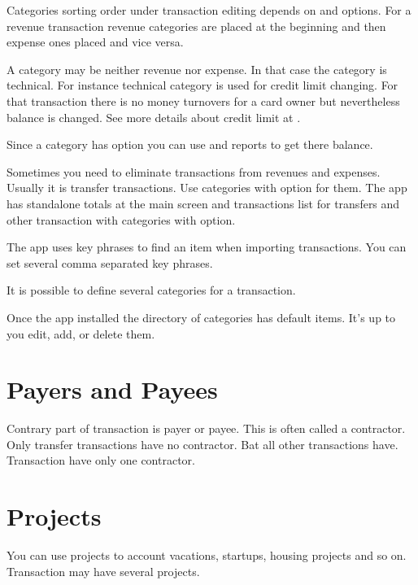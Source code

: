 \documentclass[a4paper,10pt,english]{sphinxmanual}
\begin{document}
Categories sorting order under transaction editing depends on
 and  options. For a revenue transaction
revenue categories are placed at the beginning and then expense ones placed and vice versa.

A category may be neither revenue nor expense. In that case the category is technical. For instance
technical category is used for credit limit changing. For that transaction there is no money turnovers
for a card owner but nevertheless balance is changed. See more details about credit limit at
.

Since a category has  option you can use  and 
reports to get there balance.

Sometimes you need to eliminate transactions from revenues and expenses. Usually it is
transfer transactions. Use categories with  option for them.
The app has standalone totals at the main screen and transactions list for transfers and other transaction with
categories with  option.

The app uses key phrases to find an item when importing transactions. You can set several
comma separated key phrases.

It is possible to define several categories for a transaction.

Once the app installed the directory of categories has default items. It’s up to you edit, add, or delete them.


\section{Payers and Payees}
\label{\detokenize{directories:payers-and-payees}}
Contrary part of transaction is payer or payee. This is often called a contractor. Only transfer transactions
have no contractor. Bat all other transactions have. Transaction have only one contractor.


\section{Projects}
\label{\detokenize{directories:projects}}
You can use projects to account vacations, startups, housing projects and so on.
Transaction may have several projects.
\end{document}
